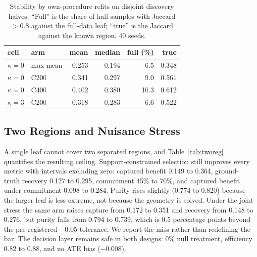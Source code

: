 \documentclass[conference]{IEEEtran}
\begin{document}
\begin{table}[t]
\caption{Stability by own-procedure refits on disjoint discovery halves.
``Full'' is the share of half-samples with Jaccard $>0.8$ against the full-data
leaf; ``true'' is the Jaccard against the known region. 40 seeds.}
\label{tab:stab}
\centering
\footnotesize
\setlength{\tabcolsep}{3pt}
\begin{tabular}{@{}llrrrr@{}}
\toprule
cell & arm & mean & median & full (\%) & true\\
\midrule
$\kappa=0$ & max mean      & 0.253 & 0.194 & 6.5 & 0.348\\
$\kappa=0$ & C200          & 0.341 & 0.297 & 9.0 & 0.561\\
$\kappa=0$ & C400          & 0.402 & 0.380 & 10.3 & 0.612\\
$\kappa=3$ & C200          & 0.318 & 0.283 & 6.6 & 0.522\\
\bottomrule
\end{tabular}
\end{table}

\subsection{Two Regions and Nuisance Stress}

A single leaf cannot cover two separated regions, and
Table~\ref{tab:tworeg} quantifies the resulting ceiling. Support-constrained
selection still improves every metric with intervals excluding zero: captured
benefit 0.149 to 0.364, ground-truth recovery 0.127 to 0.295, commitment 45\%
to 70\%, and captured benefit under commitment 0.098 to 0.284. Purity rises
slightly (0.774 to 0.820) because the larger leaf is less extreme, not because
the geometry is solved. Under the joint stress the same arm raises capture from
0.172 to 0.351 and recovery from 0.148 to 0.276, but purity falls from 0.794 to
0.739, which is 0.5 percentage points beyond the pre-registered $-0.05$
tolerance. We report the miss rather than redefining the bar. The decision
layer remains safe in both designs: $0\%$ null treatment, efficiency 0.82 to
0.88, and no ATE bias ($-0.008$).
\end{document}
